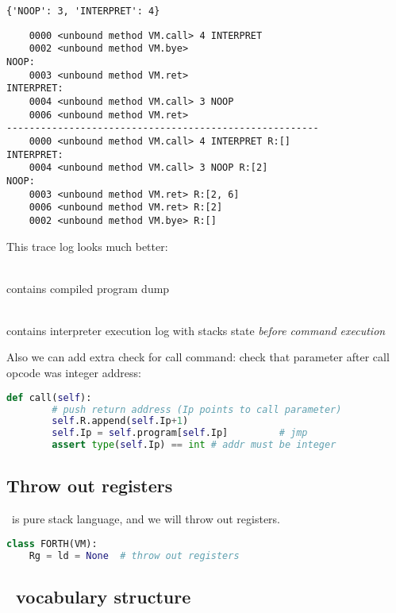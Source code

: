 \begin{lstlisting}
{'NOOP': 3, 'INTERPRET': 4}
\end{lstlisting}
\clearpage
\begin{lstlisting}
	0000 <unbound method VM.call> 4 INTERPRET 
	0002 <unbound method VM.bye> 
NOOP: 
	0003 <unbound method VM.ret> 
INTERPRET: 
	0004 <unbound method VM.call> 3 NOOP 
	0006 <unbound method VM.ret>
-------------------------------------------------------
	0000 <unbound method VM.call> 4 INTERPRET R:[] 
INTERPRET: 
	0004 <unbound method VM.call> 3 NOOP R:[2] 
NOOP: 
	0003 <unbound method VM.ret> R:[2, 6] 
	0006 <unbound method VM.ret> R:[2] 
	0002 <unbound method VM.bye> R:[]
\end{lstlisting}
This trace log looks much better:
\begin{description}[nosep]
\item[first part]\ \\contains compiled program dump
\item[second part]\ \\contains interpreter execution log with stacks state
\emph{before command execution}
\end{description}

\bigskip
Also we can add extra check for call command: check that parameter after call
opcode was integer address:
\begin{lstlisting}[language=Python]
	def call(self):
		# push return address (Ip points to call parameter)
		self.R.append(self.Ip+1)
		self.Ip = self.program[self.Ip]			# jmp
		assert type(self.Ip) == int	# addr must be integer
\end{lstlisting}

\subsection{Throw out registers}

\F\ is pure stack language, and we will throw out registers.
\begin{lstlisting}[language=Python]
class FORTH(VM):
	Rg = ld = None	# throw out registers
\end{lstlisting}

\subsection{\F\ vocabulary structure}
